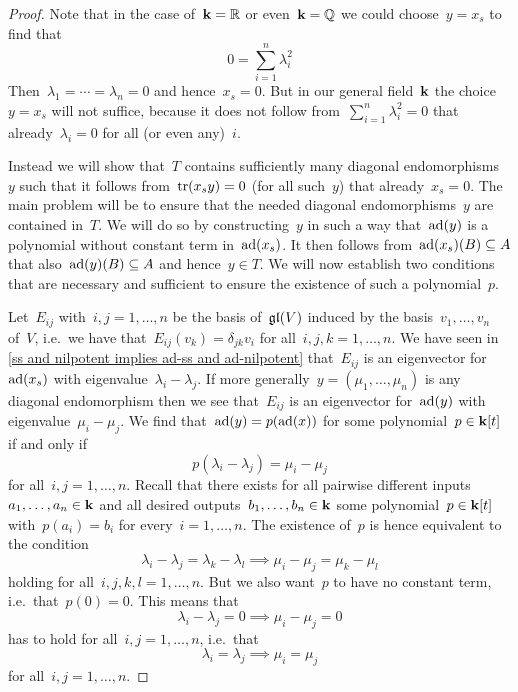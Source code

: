 \begin{proof}
  Note that in the case of~$\mathbf{k} = \mathbb{R}$ or even~$\mathbf{k} = \mathbb{Q}$ we could choose~$y = x_s$ to find that
  \begin{equation}
    \label{sum of squares is zero}
    0
    =
    \sum_{i=1}^n \lambda_i^2
  \end{equation}
  Then~$\lambda_1 = \dotsb = \lambda_n = 0$ and hence~$x_s = 0$.
  But in our general field~$\mathbf{k}$ the choice~$y = x_s$ will not suffice, because it does not follow from~$\sum_{i=1}^n \lambda_i^2 = 0$ that already~$\lambda_i = 0$ for all (or even any)~$i$.
  
  Instead we will show that~$T$ contains sufficiently many diagonal endomorphisms~$y$ such that it follows from~$\operatorname{tr}(x_s y) = 0$ (for all such~$y$) that already~$x_s = 0$.
  The main problem will be to ensure that the needed diagonal endomorphisms~$y$ are contained in~$T$.
  We will do so by constructing~$y$ in such a way that~$\operatorname{ad}(y)$ is a polynomial without constant term in~$\operatorname{ad}(x_s)$.
  It then follows from~$\operatorname{ad}(x_s)(B) \subseteq A$ that also~$\operatorname{ad}(y)(B) \subseteq A$ and hence~$y \in T$.
  We will now establish two conditions that are necessary and sufficient to ensure the existence of such a polynomial~$p$.
  
  Let~$E_{ij}$ with~$i,j = 1, \dotsc, n$ be the basis of~$\mathfrak{gl}(V)$ induced by the basis~$v_1, \dotsc, v_n$ of~$V$, i.e.\ we have that~$E_{ij}(v_k) = \delta_{jk} v_i$ for all~$i,j,k = 1, \dotsc, n$.
  We have seen in \cref{ss and nilpotent implies ad-ss and ad-nilpotent} that~$E_{ij}$ is an eigenvector for~$\operatorname{ad}(x_s)$ with eigenvalue~$\lambda_i - \lambda_j$.
  If more generally~$y = (\mu_1, \dotsc, \mu_n)$ is any diagonal endomorphism then we see that~$E_{ij}$ is an eigenvector for~$\operatorname{ad}(y)$ with eigenvalue~$\mu_i - \mu_j$.
  We find that~$\operatorname{ad}(y) = p(\operatorname{ad}(x))$ for some polynomial~$p \in \mathbf{k}[t]$ if and only if
  \[
    p(\lambda_i - \lambda_j)
    =
    \mu_i - \mu_j
  \]
  for all~$i, j = 1, \dotsc, n$.
  Recall that there exists for all pairwise different inputs~$a_1, \dotsc, a_n \in \mathbf{k}$ and all desired outputs~$b_1, \dotsc, b_n \in \mathbf{k}$ some polynomial~$p \in \mathbf{k}[t]$ with~$p(a_i) = b_i$ for every~$i = 1, \dotsc, n$.
  The existence of~$p$ is hence equivalent to the condition
  \begin{equation}
    \label{difference condition}
    \lambda_i - \lambda_j
    =
    \lambda_k - \lambda_l
    \implies
    \mu_i - \mu_j
    =
    \mu_k - \mu_l
  \end{equation}
  holding for all~$i,j,k,l = 1, \dotsc, n$.
  But we also want~$p$ to have no constant term, i.e.\ that~$p(0) = 0$.
  This means that
  \[
    \lambda_i - \lambda_j = 0
    \implies
    \mu_i - \mu_j = 0
  \]
  has to hold for all~$i, j = 1, \dotsc, n$, i.e.\ that
  \begin{equation}
    \label{function condition}
    \lambda_i = \lambda_j
    \implies
    \mu_i = \mu_j
  \end{equation}
  for all~$i, j = 1, \dotsc, n$.
  

\end{proof}
